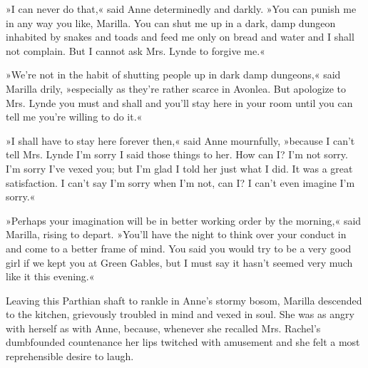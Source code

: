 »I can never do that,« said Anne determinedly and darkly. »You can punish me in any way you like, Marilla. You can shut me up in a dark, damp dungeon inhabited by snakes and toads and feed me only on bread and water and I shall not complain. But I cannot ask Mrs. Lynde to forgive me.«

»We’re not in the habit of shutting people up in dark damp dungeons,« said Marilla drily, »especially as they’re rather scarce in Avonlea. But apologize to Mrs. Lynde you must and shall and you’ll stay here in your room until you can tell me you’re willing to do it.«

»I shall have to stay here forever then,« said Anne mournfully, »because I can’t tell Mrs. Lynde I’m sorry I said those things to her. How can I? I’m not sorry. I’m sorry I’ve vexed you; but I’m glad I told her just what I did. It was a great satisfaction. I can’t say I’m sorry when I’m not, can I? I can’t even imagine I’m sorry.«

»Perhaps your imagination will be in better working order by the morning,« said Marilla, rising to depart. »You’ll have the night to think over your conduct in and come to a better frame of mind. You said you would try to be a very good girl if we kept you at Green Gables, but I must say it hasn’t seemed very much like it this evening.«

Leaving this Parthian shaft to rankle in Anne’s stormy bosom, Marilla descended to the kitchen, grievously troubled in mind and vexed in soul. She was as angry with herself as with Anne, because, whenever she recalled Mrs. Rachel’s dumbfounded countenance her lips twitched with amusement and she felt a most reprehensible desire to laugh.